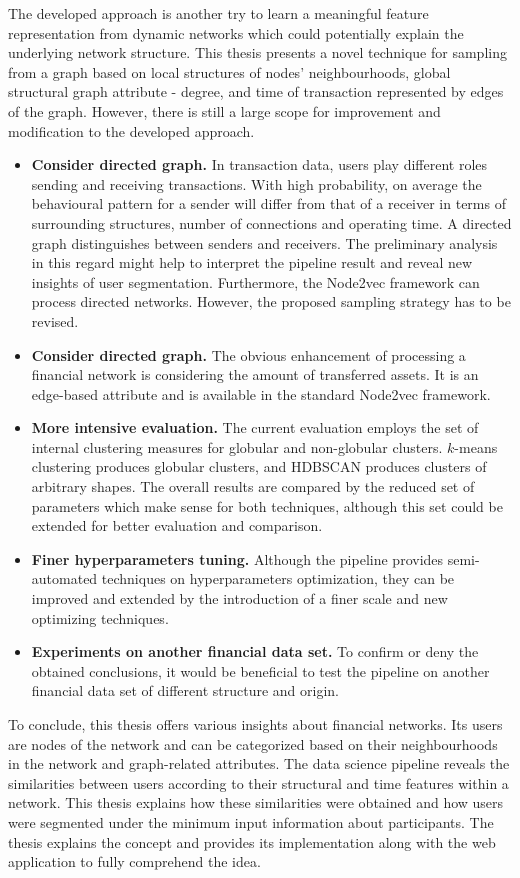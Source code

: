 The developed approach is another try to learn a meaningful feature representation from dynamic networks which could potentially explain the underlying network structure. This thesis presents a novel technique for sampling from a graph based on local structures of nodes' neighbourhoods, global structural graph attribute - degree, and time of transaction represented by edges of the graph. However, there is still a large scope for improvement and modification to the developed approach.
\begin{itemize}
    \item \textbf{Consider directed graph. }In transaction data, users play different roles sending and receiving transactions. With high probability, on average the behavioural pattern for a sender will differ from that of a receiver in terms of surrounding structures, number of connections and operating time. A directed graph distinguishes between senders and receivers. The preliminary analysis in this regard might help to interpret the pipeline result and reveal new insights of user segmentation. Furthermore, the Node2vec framework can process directed networks. However, the proposed sampling strategy has to be revised.
    \item \textbf{Consider directed graph. }The obvious enhancement of processing a financial network is considering the amount of transferred assets. It is an edge-based attribute and is available in the standard Node2vec framework.
    \item \textbf{More intensive evaluation. }The current evaluation employs the set of internal clustering measures for globular and non-globular clusters. $k$-means clustering produces globular clusters, and HDBSCAN produces clusters of arbitrary shapes. The overall results are compared by the reduced set of parameters which make sense for both techniques, although this set could be extended for better evaluation and comparison.
    \item \textbf{Finer hyperparameters tuning. }Although the pipeline provides semi-automated techniques on hyperparameters optimization, they can be improved and extended by the introduction of a finer scale and new optimizing techniques.
    \item \textbf{Experiments on another financial data set. }To confirm or deny the obtained conclusions, it would be beneficial to test the pipeline on another financial data set of different structure and origin.
\end{itemize}
To conclude, this thesis offers various insights about financial networks. Its users are nodes of the network and can be categorized based on their neighbourhoods in the network and graph-related attributes. The data science pipeline reveals the similarities between users according to their structural and time features within a network. This thesis explains how these similarities were obtained and how users were segmented under the minimum input information about participants. The thesis explains the concept and provides its implementation along with the web application to fully comprehend the idea.

